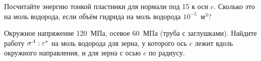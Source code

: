 \begin{exercise}
Посчитайте энергию тонкой пластинки для нормали под 15\textdegree{} к оси $c$. Сколько это на моль водорода, если
объём гидрида на моль водорода $10^{-5}$~м$^3$?
\end{exercise}

\begin{exercise}
Окружное напряжение 120~МПа, осевое 60~МПа (труба с заглушками). Найдите работу $\sigma^A:\varepsilon^*$ на моль водорода для
зерна, у которого ось $c$ лежит вдоль окружного направления, и для зерна с осью $c$ по радиусу.
\end{exercise}
